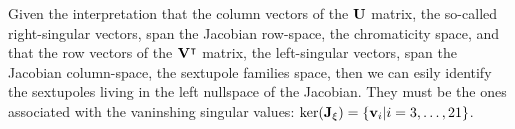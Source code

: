 Given the interpretation that the column vectors of the $\vb{U}$ matrix, the so-called right-singular vectors, span the Jacobian row-space, the chromaticity space, and that the row vectors of the $\vb{V}^\intercal$ matrix, the left-singular vectors, span the Jacobian column-space, the sextupole families space, then we can esily identify the sextupoles living in the left nullspace of the Jacobian. They must be the ones associated with the vaninshing singular values: $\text{ker}(\vb{J}_\xi) = \{\vb{v}_i|i=3,\dots,21\}$.
